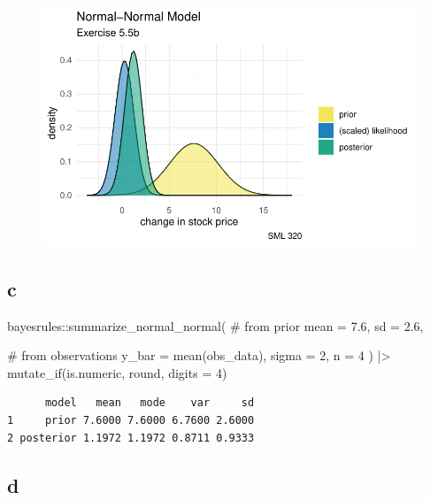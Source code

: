 \documentclass[
  letterpaper,
  DIV=11,
  numbers=noendperiod]{scrartcl}
\newenvironment{Shaded}{\begin{snugshade}}{\end{snugshade}}
\newcommand{\AttributeTok}[1]{\textcolor[rgb]{0.40,0.45,0.13}{#1}}
\newcommand{\CommentTok}[1]{\textcolor[rgb]{0.37,0.37,0.37}{#1}}
\newcommand{\DecValTok}[1]{\textcolor[rgb]{0.68,0.00,0.00}{#1}}
\newcommand{\FloatTok}[1]{\textcolor[rgb]{0.68,0.00,0.00}{#1}}
\newcommand{\FunctionTok}[1]{\textcolor[rgb]{0.28,0.35,0.67}{#1}}
\newcommand{\NormalTok}[1]{\textcolor[rgb]{0.00,0.23,0.31}{#1}}
\newcommand{\SpecialCharTok}[1]{\textcolor[rgb]{0.37,0.37,0.37}{#1}}
\begin{document}
\begin{figure}[H]

{\centering \includegraphics{ps4_code_files/figure-pdf/unnamed-chunk-10-1.pdf}

}

\end{figure}

\hypertarget{c-2}{%
\subsection{c}\label{c-2}}

\begin{Shaded}
\begin{Highlighting}[]
\NormalTok{bayesrules}\SpecialCharTok{::}\FunctionTok{summarize\_normal\_normal}\NormalTok{(}
  \CommentTok{\# from prior}
  \AttributeTok{mean =} \FloatTok{7.6}\NormalTok{, }\AttributeTok{sd =} \FloatTok{2.6}\NormalTok{,}
  
  \CommentTok{\# from observations}
  \AttributeTok{y\_bar =} \FunctionTok{mean}\NormalTok{(obs\_data), }\AttributeTok{sigma =} \DecValTok{2}\NormalTok{, }\AttributeTok{n =} \DecValTok{4}
\NormalTok{) }\SpecialCharTok{|\textgreater{}}
  \FunctionTok{mutate\_if}\NormalTok{(is.numeric, round, }\AttributeTok{digits =} \DecValTok{4}\NormalTok{)}
\end{Highlighting}
\end{Shaded}

\begin{verbatim}
      model   mean   mode    var     sd
1     prior 7.6000 7.6000 6.7600 2.6000
2 posterior 1.1972 1.1972 0.8711 0.9333
\end{verbatim}

\hypertarget{d-2}{%
\subsection{d}\label{d-2}}
\end{document}
